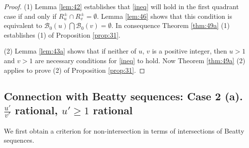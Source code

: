 \documentclass[12pt,letterpaper, reqno]{amsart}
\theoremstyle{definition}
\theoremstyle{remark}
\newcommand{\uu}{{u'}}
\newcommand{\vv}{{v'}}
\newcommand{\sB}{{\mathcal B}}
\begin{document}
\begin{proof}
(1)  Lemma \ref{lem:42} establishes that \eqref{ineq} will hold  in the first quadrant case  if and only if $R_u^{\pm} \cap R_v^{\pm} = \emptyset$.
 Lemma \ref{lem:46} shows that this condition is equivalent to $\sB_0(u) \bigcap \sB_0(v) = \emptyset$.
In consequence  Theorem \ref{thm:49a} (1)   establishes (1) of Proposition \ref{prop:31}.

(2)  Lemma \ref{lem:43a} shows that if neither of $u$, $v$ is a positive integer,
then $u>1$ and $v>1$ are necessary conditions for \eqref{ineq} to hold. 
Now Theorem \ref{thm:49a} (2) applies to prove  (2) of Proposition \ref{prop:31}.
\end{proof}

%
\subsection{Connection with Beatty sequences:  Case 2 (a).  $\frac{\uu}{\vv}$ rational, $\uu \geq 1$ rational}\label{sec:54}

 We first  obtain a criterion for non-intersection  in terms of intersections of Beatty sequences.
\end{document}
